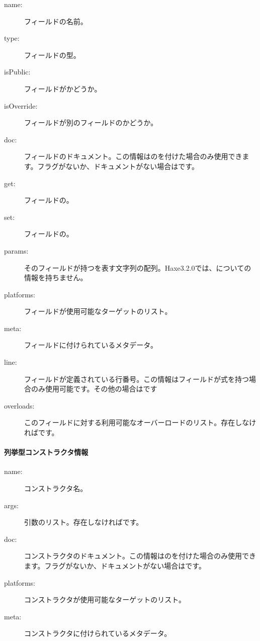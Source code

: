 \begin{description}
	\item[name:] フィールドの名前。
	\item[type:] フィールドの型。
	\item[isPublic:] フィールドがかどうか。
	\item[isOverride:] フィールドが別のフィールドのかどうか。
	\item[doc:] フィールドのドキュメント。この情報はのを付けた場合のみ使用できます。フラグがないか、ドキュメントがない場合はです。
	\item[get:] フィールドの。
	\item[set:] フィールドの。
	\item[params:] そのフィールドが持つを表す文字列の配列。Haxe3.2.0では、についての情報を持ちません。
	\item[platforms:] フィールドが使用可能なターゲットのリスト。
	\item[meta:] フィールドに付けられているメタデータ。
	\item[line:] フィールドが定義されている行番号。この情報はフィールドが式を持つ場合のみ使用可能です。その他の場合はです
	\item[overloads:] このフィールドに対する利用可能なオーバーロードのリスト。存在しなければです。
\end{description}

\paragraph{列挙型コンストラクタ情報}
\label{cr-rtti-enum-constructor-information}

\begin{description}
	\item[name:] コンストラクタ名。
	\item[args:] 引数のリスト。存在しなければです。
	\item[doc:] コンストラクタのドキュメント。この情報はのを付けた場合のみ使用できます。フラグがないか、ドキュメントがない場合はです。
	\item[platforms:] コンストラクタが使用可能なターゲットのリスト。
	\item[meta:] コンストラクタに付けられているメタデータ。
\end{description}
